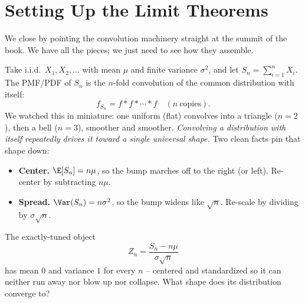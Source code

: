\section{Setting Up the Limit Theorems}
\label{ch17:limit-setup}

We close by pointing the convolution machinery straight at the summit of
the book. We have all the pieces; we just need to see how they assemble.

\begin{intuitionbox}
Take i.i.d.\ $X_1,X_2,\dots$ with mean $\mu$ and finite variance
$\sigma^2$, and let $S_n=\sum_{i=1}^n X_i$. The PMF/PDF of $S_n$ is the
$n$-fold convolution of the common distribution with itself:
\[
f_{S_n} = f * f * \cdots * f \quad (n\ \text{copies}).
\]
We watched this in miniature: one uniform (flat) convolves into a triangle
($n{=}2$), then a bell ($n{=}3$), smoother and smoother. \emph{Convolving
a distribution with itself repeatedly drives it toward a single universal
shape.} Two clean facts pin that shape down:
\begin{itemize}
  \item \textbf{Center.} $\E[S_n]=n\mu$, so the bump marches off to the
        right (or left). Re-center by subtracting $n\mu$.
  \item \textbf{Spread.} $\Var(S_n)=n\sigma^2$, so the bump widens like
        $\sqrt n$. Re-scale by dividing by $\sigma\sqrt n$.
\end{itemize}
The exactly-tuned object
\[
Z_n=\frac{S_n-n\mu}{\sigma\sqrt n}
\]
has mean $0$ and variance $1$ for every $n$ -- centered and standardized
so it can neither run away nor blow up nor collapse. What shape does its
distribution converge to?
\end{intuitionbox}

